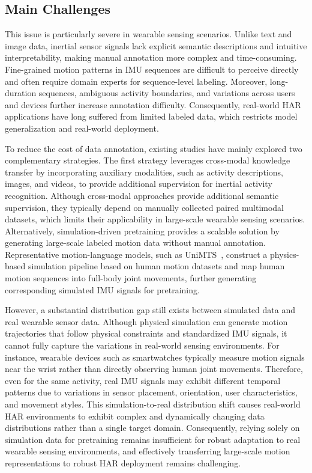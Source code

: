\documentclass[journal]{IEEEtran}
\begin{document}
\subsection{Main Challenges}

This issue is particularly severe in wearable sensing scenarios. Unlike text and image data, inertial sensor signals lack explicit semantic descriptions and intuitive interpretability, making manual annotation more complex and time-consuming. Fine-grained motion patterns in IMU sequences are difficult to perceive directly and often require domain experts for sequence-level labeling. Moreover, long-duration sequences, ambiguous activity boundaries, and variations across users and devices further increase annotation difficulty. Consequently, real-world HAR applications have long suffered from limited labeled data, which restricts model generalization and real-world deployment.

To reduce the cost of data annotation, existing studies have mainly explored two complementary strategies. The first strategy leverages cross-modal knowledge transfer by incorporating auxiliary modalities, such as activity descriptions, images, and videos, to provide additional supervision for inertial activity recognition. Although cross-modal approaches provide additional semantic supervision, they typically depend on manually collected paired multimodal datasets, which limits their applicability in large-scale wearable sensing scenarios. Alternatively, simulation-driven pretraining provides a scalable solution by generating large-scale labeled motion data without manual annotation. Representative motion-language models, such as UniMTS~\cite{unimts}, construct a physics-based simulation pipeline based on human motion datasets and map human motion sequences into full-body joint movements, further generating corresponding simulated IMU signals for pretraining.

However, a substantial distribution gap still exists between simulated data and real wearable sensor data. Although physical simulation can generate motion trajectories that follow physical constraints and standardized IMU signals, it cannot fully capture the variations in real-world sensing environments. For instance, wearable devices such as smartwatches typically measure motion signals near the wrist rather than directly observing human joint movements. Therefore, even for the same activity, real IMU signals may exhibit different temporal patterns due to variations in sensor placement, orientation, user characteristics, and movement styles. This simulation-to-real distribution shift causes real-world HAR environments to exhibit complex and dynamically changing data distributions rather than a single target domain. Consequently, relying solely on simulation data for pretraining remains insufficient for robust adaptation to real wearable sensing environments, and effectively transferring large-scale motion representations to robust HAR deployment remains challenging.
\end{document}
